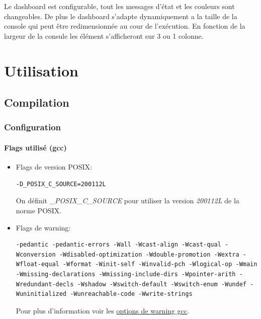 \documentclass[article, backcover, french, nodocumentinfo]{upmethodology-document}
\begin{document}
					Le dashboard est configurable, tout les messages d'état et les couleurs sont changeables. De plus le dashboard s'adapte dynamiquement a la taille de la console qui peut être redimensionnée au cour de l’exécution. En fonction de la largeur de la consule les élément s’afficheront sur 3 ou 1 colonne.
	\section{Utilisation}
		\subsection{Compilation}
			\subsubsection{Configuration}
				\paragraph*{Flags utilisé (gcc)}
					\begin{itemize}
						\item Flags de version POSIX:
							\begin{lstlisting}[breaklines=true,breakatwhitespace=true,breakindent=0pt,columns=fixed,keepspaces=true,frame=single,basicstyle=\footnotesize\sffamily]
-D_POSIX_C_SOURCE=200112L\end{lstlisting}
							On définit \textit{\_POSIX\_C\_SOURCE} pour utiliser la version \textit{200112L} de la norme POSIX.
						\item Flags de warning:
							\begin{lstlisting}[breaklines=true,breakatwhitespace=true,breakindent=0pt,columns=fixed,keepspaces=true,frame=single,basicstyle=\footnotesize\sffamily]
-pedantic -pedantic-errors -Wall -Wcast-align -Wcast-qual -Wconversion -Wdisabled-optimization -Wdouble-promotion -Wextra -Wfloat-equal -Wformat -Winit-self -Winvalid-pch -Wlogical-op -Wmain -Wmissing-declarations -Wmissing-include-dirs -Wpointer-arith -Wredundant-decls -Wshadow -Wswitch-default -Wswitch-enum -Wundef -Wuninitialized -Wunreachable-code -Wwrite-strings\end{lstlisting}
							Pour plus d'information voir les \href{https://gcc.gnu.org/onlinedocs/gcc/Warning-Options.html}{options de warning gcc}.
					\end{itemize}
\end{document}
